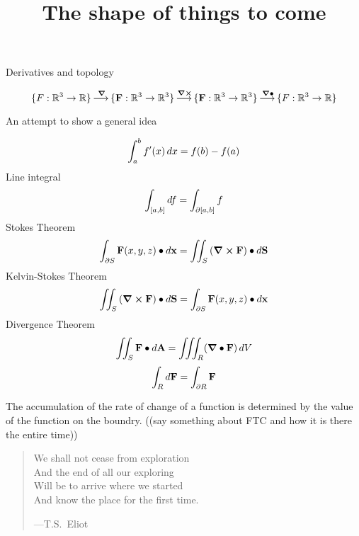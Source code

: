 \documentclass{ximera}
\title[Dig-In:]{The shape of things to come}
\begin{document}
\begin{abstract}
\end{abstract}
\maketitle


Derivatives and topology


\[
\{F:\mathbb R^3 \to \mathbb R\} \mathop{\longrightarrow\,}\limits^{\boldsymbol\nabla} \{\mathbf{F}: \mathbb R^3 \to \mathbb R^3\} \mathop{\longrightarrow\,}\limits^{\boldsymbol\nabla\boldsymbol\times}
\{\mathbf{F}:\mathbb R^3 \to \mathbb R^3\} \mathop{\longrightarrow\,}\limits^{\boldsymbol\nabla\bullet} \{F:\mathbb R^3 \to \mathbb R\}
\]

An attempt to show a general idea

\[
\int_a^b f'(x) \mathop{}\!d x = f(b) - f(a)
\]
Line integral
\[
\int_{[a,b]} \mathop{}\!d f = \int_{\partial[a,b]} f
\]
Stokes Theorem
\[
\int_{\partial S} \mathbf{F}(x,y,z)\bullet \mathop{}\!d \mathbf{x} = \iint_S \left(\boldsymbol\nabla\boldsymbol\times\mathbf{F}\right)\bullet \mathop{}\!d \mathbf{S}
\]
Kelvin-Stokes Theorem
\[
\iint_S \left(\boldsymbol\nabla\boldsymbol\times\mathbf{F}\right)\bullet \mathop{}\!d \mathbf{S} = \int_{\partial S} \mathbf{F}(x,y,z)\bullet \mathop{}\!d \mathbf{x}
\]
Divergence Theorem
\[
\iint_S \mathbf{F}\bullet \mathop{}\!d \mathbf{A} = \iiint_R (\boldsymbol\nabla\bullet \mathbf{F}) \mathop{}\!d V
\]
\[
\int_R \mathop{}\!d \mathbf{F} = \int_{\partial R} \mathbf{F}
\]

The accumulation of the rate of change of a function is determined by
the value of the function on the boundry. ((say something about FTC and how it is there the entire time))

\begin{quote}
  We shall not cease from exploration\\
  And the end of all our exploring \\
  Will be to arrive where we started \\
  And know the place for the first time.

  \hfill ---T.S.\ Eliot
\end{quote}
\end{document}
